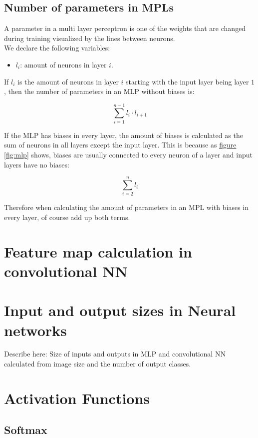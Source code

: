 \subsection{Number of parameters in MPLs}

A parameter in a multi layer perceptron is one of the weights that are changed during training visualized by the lines between neurons.\\

We declare the following variables:
\begin{itemize}
    \item $l_{i}$: amount of neurons in layer $i$.
\end{itemize}

If $l_{i}$ is the amount of neurons in layer $i$ starting with the input layer being layer $1$, then the number of parameters in an MLP without biases is:

$$
    \sum_{i=1}^{n-1}l_{i}\cdot{l_{i+1}}
$$

If the MLP has biases in every layer, the amount of biases is calculated as the sum of neurons in all layers except the input layer. This is because as \hyperref[fig:mlp]{figure \ref*{fig:mlp}} shows, biases are usually connected to every neuron of a layer and input layers have no biases:

$$
    \sum_{i=2}^{n}l_{i}
$$

Therefore when calculating the amount of parameters in an MPL with biases in every layer, of course add up both terms.

\section{Feature map calculation in convolutional NN}

\section{Input and output sizes in Neural networks}
Describe here: Size of inputs and outputs in MLP and convolutional NN calculated from image size and the number of output classes.

\section{Activation Functions}
\label{sec:activation_functions}
\subsection{Softmax}
